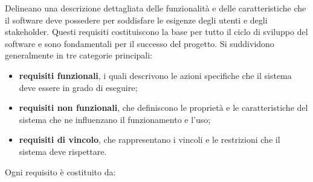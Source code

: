 Delineano una descrizione dettagliata delle funzionalità e delle caratteristiche che il software deve possedere per soddisfare le esigenze degli utenti e degli stakeholder. Questi requisiti costituiscono la base per tutto il ciclo di sviluppo del software e sono fondamentali per il successo del progetto. Si suddividono generalmente in tre categorie principali:
\begin{itemize}
	\item \textbf{requisiti funzionali}, i quali descrivono le azioni specifiche che il sistema deve essere in grado di eseguire;
	\item \textbf{requisiti non funzionali}, che definiscono le proprietà e le caratteristiche del sistema che ne influenzano il funzionamento e l'uso;
	\item \textbf{requisiti di vincolo}, che rappresentano i vincoli e le restrizioni che il sistema deve rispettare.
\end{itemize}
Ogni requisito è costituito da:
